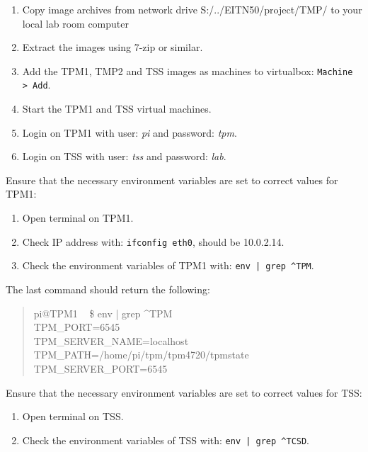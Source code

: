 \documentclass[10pt]{article}
\newcommand{\command}[1]{\texttt{#1}}
\begin{document}
      \begin{enumerate}
        \item{Copy image archives from network drive S:/../EITN50/project/TMP/ to
          your local lab room computer}
        \item{Extract the images using 7-zip or similar.}
        \item{Add the TPM1, TMP2 and TSS images as machines to virtualbox:
          \command{Machine > Add}.}
        \item{Start the TPM1 and TSS virtual machines.}
        \item{Login on TPM1 with user: \emph{pi} and password: \emph{tpm}.}
        \item{Login on TSS with user: \emph{tss} and password: \emph{lab}.}
      \end{enumerate}

      Ensure that the necessary environment variables are set to correct values
      for TPM1:

      \begin{enumerate}
        \item{Open terminal on TPM1.}
        \item{Check IP address with: \command{ifconfig eth0}, should be 10.0.2.14.}
        \item{Check the environment variables of TPM1 with: \command{env | grep
          \textasciicircum TPM}.}
      \end{enumerate}

      The last command should return the following:
      \begin{quote}
        pi@TPM1 ~ \$ env | grep \textasciicircum TPM\\
        TPM\_PORT=6545\\
        TPM\_SERVER\_NAME=localhost\\
        TPM\_PATH=/home/pi/tpm/tpm4720/tpmstate\\
        TPM\_SERVER\_PORT=6545
      \end{quote}

      Ensure that the necessary environment variables are set to correct values
      for TSS:

      \begin{enumerate}
        \item{Open terminal on TSS.}
        \item{Check the environment variables of TSS with: \command{env | grep
          \textasciicircum TCSD}.}
      \end{enumerate}
\end{document}
